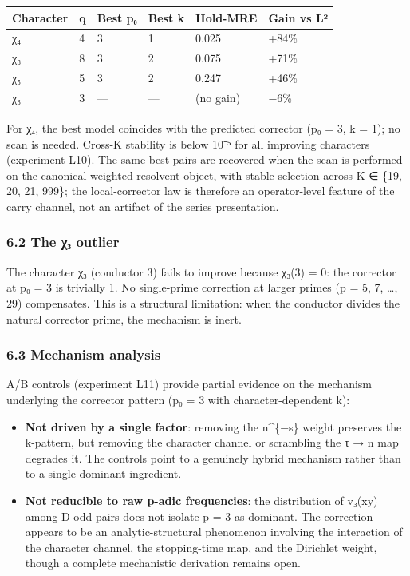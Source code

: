 \documentclass[
  11pt,
]{article}
\providecommand{\tightlist}{%
  \setlength{\itemsep}{0pt}\setlength{\parskip}{0pt}}
\begin{document}
\begin{longtable}[]{@{}llllll@{}}
\toprule\noalign{}
Character & q & Best p₀ & Best k & Hold-MRE & Gain vs L² \\
\midrule\noalign{}
\endhead
\bottomrule\noalign{}
\endlastfoot
χ₄ & 4 & 3 & 1 & 0.025 & +84\% \\
χ₈ & 8 & 3 & 2 & 0.075 & +71\% \\
χ₅ & 5 & 3 & 2 & 0.247 & +46\% \\
χ₃ & 3 & --- & --- & (no gain) & −6\% \\
\end{longtable}

For χ₄, the best model coincides with the predicted corrector (p₀ = 3, k = 1);
no scan is needed. Cross-K stability is below 10⁻⁵ for all improving characters
(experiment L10). The same best pairs are recovered when the scan is performed
on the canonical weighted-resolvent object, with stable selection across K ∈
\{19, 20, 21, 999\}; the local-corrector law is therefore an operator-level
feature of the carry channel, not an artifact of the series presentation.

\subsubsection{6.2 The χ₃ outlier}\label{the-ux3c7ux2083-outlier}

The character χ₃ (conductor 3) fails to improve because χ₃(3) = 0: the corrector
at p₀ = 3 is trivially 1. No single-prime correction at larger primes (p = 5, 7,
\ldots, 29) compensates. This is a structural limitation: when the conductor
divides the natural corrector prime, the mechanism is inert.

\subsubsection{6.3 Mechanism analysis}\label{mechanism-analysis}

A/B controls (experiment L11) provide partial evidence on the mechanism
underlying the corrector pattern (p₀ = 3 with character-dependent k):

\begin{itemize}
\tightlist
\item
  \textbf{Not driven by a single factor}: removing the n\^{}\{−s\} weight
  preserves the k-pattern, but removing the character channel or scrambling the
  τ → n map degrades it. The controls point to a genuinely hybrid mechanism
  rather than to a single dominant ingredient.
\item
  \textbf{Not reducible to raw p-adic frequencies}: the distribution of v₃(xy)
  among D-odd pairs does not isolate p = 3 as dominant. The correction appears
  to be an analytic-structural phenomenon involving the interaction of the
  character channel, the stopping-time map, and the Dirichlet weight, though a
  complete mechanistic derivation remains open.
\end{itemize}
\end{document}
